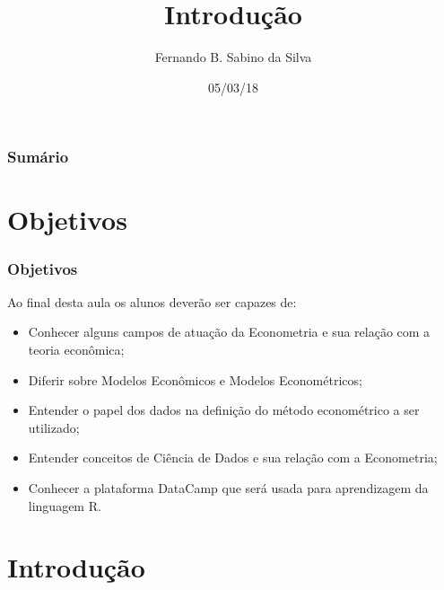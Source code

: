 \documentclass[pdf,9pt,xcolor=dvipsnames,hide notes]{beamer}\usepackage[]{graphicx}\usepackage[]{color}
\title[UFRGS]{Introdução}
\author[Estatística Geral II]{Fernando B. Sabino da Silva}
\date{05/03/18}
\begin{document}


\begin{frame}
   \titlepage
\end{frame}

\begin{frame}[plain]\frametitle{Sumário}
\tableofcontents
\end{frame}


\section{Objetivos}

\begin{frame}\frametitle{Objetivos}
Ao final desta aula os alunos deverão ser capazes de:
  \begin{itemize}
    \item Conhecer alguns campos de atuação da Econometria e sua relação com a teoria econômica;
    \item Diferir sobre Modelos Econômicos e Modelos Econométricos;
    \item Entender o papel dos dados na definição do método econométrico a ser utilizado;
    \item Entender conceitos de Ciência de Dados e sua relação com a Econometria;
    \item Conhecer a plataforma DataCamp que será usada para aprendizagem da linguagem R.
  \end{itemize}
\end{frame}


\section{Introdução}
\end{document}
